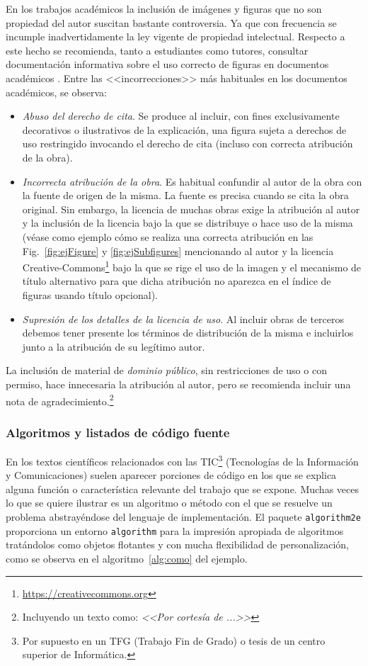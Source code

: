 En los trabajos académicos la inclusión de imágenes y figuras que no son propiedad del autor suscitan bastante controversia. Ya que con frecuencia se incumple inadvertidamente la ley vigente de propiedad intelectual. Respecto a este hecho se recomienda, tanto a estudiantes como tutores, consultar documentación informativa sobre el uso correcto de figuras en documentos académicos \cite{uclm20,unican18}. Entre las <<incorrecciones>> más habituales en los documentos académicos, se observa:
\begin{itemize}
\item \emph{Abuso del derecho de cita}. Se produce al incluir, con fines exclusivamente decorativos o ilustrativos de la explicación, una figura sujeta a derechos de uso restringido invocando el derecho de cita (incluso con correcta atribución de la obra).

\item \emph{Incorrecta atribución de la obra}. Es habitual confundir al autor de la obra con la fuente de origen de la misma. La fuente es precisa cuando se cita la obra original. Sin embargo, la licencia de muchas obras exige la atribución al autor y la inclusión de la licencia bajo la que se distribuye o hace uso de la misma (véase como ejemplo cómo se realiza una correcta atribución en las Fig.~\ref{fig:ejFigure} y \ref{fig:ejSubfigures} mencionando al autor y la licencia Creative-Commons\footnote{\url{https://creativecommons.org}} bajo la que se rige el uso de la imagen y el mecanismo de título alternativo para que dicha atribución no aparezca en el índice de figuras usando título opcional).

\item \emph{Supresión de los detalles de la licencia de uso}. Al incluir obras de terceros debemos tener presente los términos de distribución de la misma e incluirlos junto a la atribución de su legítimo autor.
\end{itemize}

La inclusión de material de \emph{dominio público}, sin restricciones de uso o con permiso, hace innecesaria la atribución al autor, pero se recomienda incluir una nota de agradecimiento.\footnote{Incluyendo un texto como: \emph{<<Por cortesía de ...>>}}



\subsubsection{Algoritmos y listados de código fuente}
En los textos científicos relacionados con las 
TIC\footnote{Por supuesto en un TFG (Trabajo Fin de Grado) o tesis 
de un centro superior de Informática.} (Tecnologías de la Información y 
Comunicaciones) suelen aparecer porciones de código en los que se explica 
alguna función o característica relevante del trabajo que se expone. Muchas 
veces lo que se quiere ilustrar es un algoritmo o método con el que se resuelve un problema abstrayéndose del lenguaje de implementación. El paquete \texttt{algorithm2e} proporciona un entorno \texttt{algorithm} para la impresión apropiada de algoritmos tratándolos como objetos flotantes y con mucha flexibilidad de personalización, como se observa en el algoritmo~\ref{alg:como} del ejemplo.


